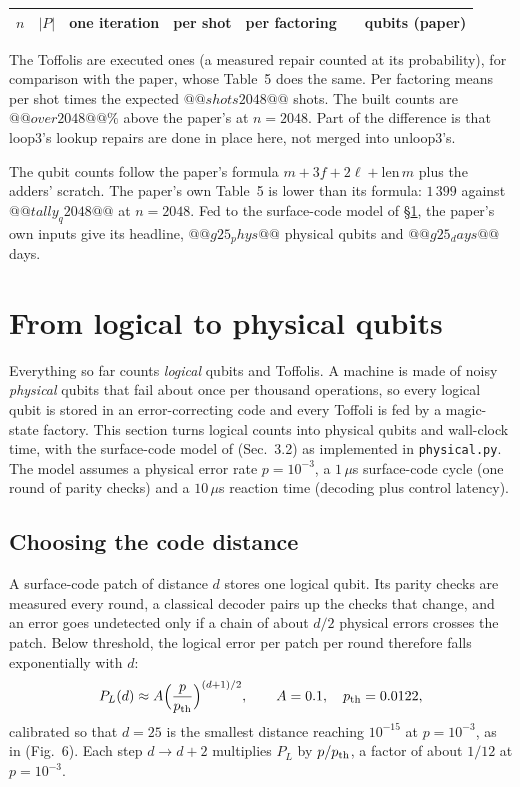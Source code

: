\begin{center}\small
\begin{tabular}{rrrrrrr}
\toprule
$n$ & $|P|$ & one iteration & per shot & per factoring & \cite{ec:gidney25rsa} & qubits (paper)\\
\midrule
\bottomrule
\end{tabular}
\end{center}

\noindent The Toffolis are executed ones (a measured repair counted at its probability), for
comparison with the paper, whose Table~5 does the same. Per factoring means per shot times the
expected $@@shots2048@@$ shots. The built counts are $@@over2048@@\%$ above the paper's at $n=2048$.
Part of the difference is that loop3's lookup repairs are done in place here, not merged into
unloop3's.

The qubit counts follow the paper's formula $m+3f+2\ell+\mathrm{len}\,m$ plus the adders'
scratch. The paper's own Table~5 is lower than its formula: $1\,399$ against
$@@tally_q2048@@$ at $n=2048$. Fed to the surface-code model of \S\ref{rsa:sec:phys}, the paper's own inputs give its
headline, $@@g25_phys@@$ physical qubits and $@@g25_days@@$ days.

\section{From logical to physical qubits}\label{rsa:sec:phys}

Everything so far counts \emph{logical} qubits and Toffolis. A machine is made of noisy
\emph{physical} qubits that fail about once per thousand operations, so every logical qubit is stored
in an error-correcting code and every Toffoli is fed by a magic-state factory. This section turns
logical counts into physical qubits and wall-clock time, with the surface-code model of
\cite{ec:gidney25rsa} (Sec.~3.2) as implemented in \texttt{physical.py}. The model assumes a
physical error rate $p=10^{-3}$, a $1\,\mu$s surface-code cycle (one round of parity checks) and a
$10\,\mu$s reaction time (decoding plus control latency).

\subsection{Choosing the code distance}

A surface-code patch of distance $d$ stores one logical qubit. Its parity checks are measured every
round, a classical decoder pairs up the checks that change, and an error goes undetected only if a
chain of about $d/2$ physical errors crosses the patch. Below threshold, the logical error per patch
per round therefore falls exponentially with $d$:
\[ P_L(d)\approx A\Big(\frac{p}{p_{\rm th}}\Big)^{(d+1)/2},\qquad A=0.1,\quad p_{\rm th}=0.0122 , \]
calibrated so that $d=25$ is the smallest distance reaching $10^{-15}$ at $p=10^{-3}$, as in
\cite{ec:gidney25rsa} (Fig.~6). Each step $d\to d+2$ multiplies $P_L$ by $p/p_{\rm th}$, a factor
of about $1/12$ at $p=10^{-3}$.

